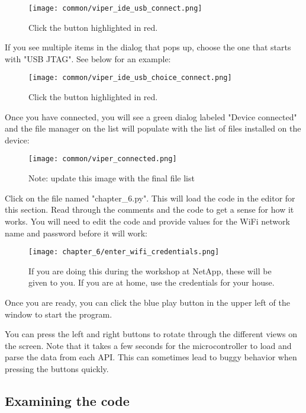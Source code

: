 \begin{figure}[H]
    \centering
    \texttt{[image: common/viper\_ide\_usb\_connect.png]}
    \caption{Click the button highlighted in red.}
\end{figure}

If you see multiple items in the dialog that pops up, choose the one that starts with "USB JTAG". See below for an example:
\begin{figure}[H]
    \centering
    \texttt{[image: common/viper\_ide\_usb\_choice\_connect.png]}
    \caption{Click the button highlighted in red.}
\end{figure}

Once you have connected, you will see a green dialog labeled "Device connected" and the file manager on the list
will populate with the list of files installed on the device:
\begin{figure}[H]
    \centering
    \texttt{[image: common/viper\_connected.png]}
    \caption{Note: update this image with the final file list}
\end{figure}

Click on the file named "chapter\_6.py". This will load the code in the editor for this section. Read through the comments
and the code to get a sense for how it works. You will need to edit the code and provide values for the WiFi network name
and password before it will work:

\begin{figure}[H]
    \centering
    \texttt{[image: chapter\_6/enter\_wifi\_credentials.png]}
    \caption{If you are doing this during the workshop at NetApp, these will be given to you. If you are at home, use the credentials for your house.}
\end{figure}

Once you are ready, you can click the blue play button in the upper left of the window
to start the program.

You can press the left and right buttons to rotate through the different views on the screen. Note that it takes
a few seconds for the microcontroller to load and parse the data from each API. This can sometimes lead to
buggy behavior when pressing the buttons quickly.

\subsection{Examining the code}

